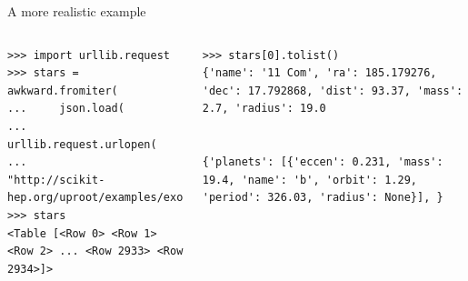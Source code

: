 \documentclass[aspectratio=169]{beamer}
\begin{document}
\begin{frame}[fragile]{A more realistic example}
\begin{columns}
\small
\begin{verbatim}
>>> import urllib.request
>>> stars = awkward.fromiter(
...     json.load(
...         urllib.request.urlopen(
...            "http://scikit-hep.org/uproot/examples/exoplanets.json")))
>>> stars
<Table [<Row 0> <Row 1> <Row 2> ... <Row 2933> <Row 2934>]>
\end{verbatim}

\begin{verbatim}
>>> stars[0].tolist()
{'name': '11 Com', 'ra': 185.179276, 'dec': 17.792868, 'dist': 93.37, 'mass': 2.7, 'radius': 19.0


{'planets': [{'eccen': 0.231, 'mass': 19.4, 'name': 'b', 'orbit': 1.29, 'period': 326.03, 'radius': None}], }
\end{verbatim}



\end{columns}
\end{frame}




\begin{frame}{}
\end{frame}
\end{document}
